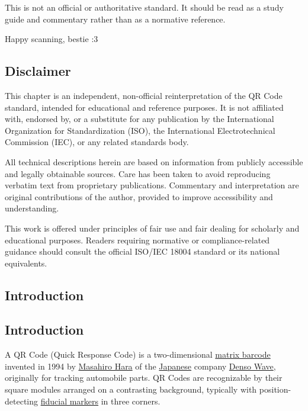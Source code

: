 \documentclass[../../1_thesis]{subfiles}
\begin{document}
This is not an official or authoritative standard. It should be read as a study guide and commentary rather than as a normative reference.


Happy scanning, bestie :3

\subsection{Disclaimer}

This chapter is an independent, non-official reinterpretation of the QR Code standard, intended for educational and reference purposes. 
It is not affiliated with, endorsed by, or a substitute for any publication by the International Organization for Standardization (ISO), the International Electrotechnical Commission (IEC), or any related standards body.  

All technical descriptions herein are based on information from publicly accessible and legally obtainable sources.  Care has been taken to avoid reproducing verbatim text from proprietary publications.  Commentary and interpretation are original contributions of the author, provided to improve accessibility and understanding.  

This work is offered under principles of fair use and fair dealing for scholarly and educational purposes. Readers requiring normative or compliance-related guidance should consult the official ISO/IEC 18004 standard or its national equivalents.


\subsection{Introduction}

\subsection{Introduction}

A QR Code (Quick Response Code) is a two-dimensional \href{https://en.wikipedia.org/wiki/Barcode\#Matrix_(2D)_codes}{matrix
barcode} invented in 1994 by \href{https://en.wikipedia.org/wiki/Masahiro_Hara}{Masahiro Hara} of the \href{https://en.wikipedia.org/wiki/Japan}{Japanese} company \href{https://en.wikipedia.org/wiki/Denso\#DENSO_Wave}{Denso Wave}, originally for tracking automobile parts. 
QR Codes are recognizable by their square modules arranged on a contrasting background, typically with position-detecting \href{https://en.wikipedia.org/wiki/Fiducial_markers}{fiducial markers} in three corners.  
\end{document}
